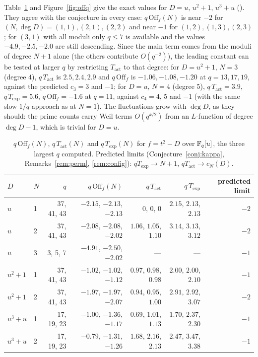 \documentclass[11pt,a4paper]{article}
\theoremstyle{remark}\newtheorem{remark}[theorem]{Remark}
\newcommand{\Off}{\mathrm{Off}}\newcommand{\e}{\mathrm{e}}
\begin{document}
Table~\ref{tab:offq} and Figure~\ref{fig:offq} give the exact values for $D=u$, $u^2+1$, $u^3+u$
().
They agree with the conjecture in every case: $q\,\Off_f(N)$ is near $-2$ for $(N,\deg D)=(1,1),(2,1),(2,2)$ and
near $-1$ for $(1,2),(1,3),(2,3)$; for $(3,1)$ with all moduli only $q\le7$ is available and the values $-4.9,-2.5,-2.0$
are still descending. Since the main term comes from the moduli of degree $N+1$ alone (the others contribute
$O(q^{-2})$), the leading constant can be tested at larger $q$ by restricting $T_{\mathrm{act}}$ to that degree: for
$D=u^2+1$, $N=3$ (degree $4$), $q\,T_{\mathrm{act}}$ is $2.5,2.4,2.9$ and $q\,\Off_f$ is $-1.06,-1.08,-1.20$ at $q=13,17,19$,
against the predicted $c_3=3$ and $-1$; for $D=u$, $N=4$ (degree $5$), $q\,T_{\mathrm{act}}=3.9$, $q\,T_{\exp}=5.6$,
$q\,\Off_f=-1.6$ at $q=11$, against $c_4=4$, $5$ and $-1$ (with the same slow $1/q$ approach as at $N=1$). The fluctuations grow with $\deg D$, as they should:
the prime counts carry Weil terms $O(q^{k/2})$ from an $L$-function of degree $\deg D-1$, which is trivial for
$D=u$.

\begin{table}[htbp]\centering\small
\caption{$q\,\Off_f(N)$, $q\,T_{\mathrm{act}}(N)$ and $q\,T_{\exp}(N)$ for $f=t^2-D$ over $\mathbb{F}_q[u]$, the three largest $q$ computed.
Predicted limits (Conjecture~\ref{conj:kappa}, Remarks~\ref{rem:perm}, \ref{rem:config}): $qT_{\exp}\to N+1$, $qT_{\mathrm{act}}\to c_N(D)$.}
\label{tab:offq}
\footnotesize\setlength{\tabcolsep}{3.5pt}
\begin{tabular}{llrrrrr}\toprule
$D$ & $N$ & $q$ & $q\,\Off_f(N)$ & $q\,T_{\mathrm{act}}$ & $q\,T_{\exp}$ & predicted limit\\\midrule
$u$     & 1 & 37, 41, 43 & $-2.15$, $-2.13$, $-2.13$ & $0$, $0$, $0$ & $2.15$, $2.13$, $2.13$ & $-2$\\
$u$     & 2 & 37, 41, 43 & $-2.08$, $-2.08$, $-2.02$ & $1.06$, $1.05$, $1.10$ & $3.14$, $3.13$, $3.12$ & $-2$\\
$u$     & 3 & 3, 5, 7    & $-4.91$, $-2.50$, $-2.02$ & --- & --- & $-1$\\
$u^2+1$ & 1 & 37, 41, 43 & $-1.02$, $-1.02$, $-1.12$ & $0.97$, $0.98$, $0.98$ & $2.00$, $2.00$, $2.10$ & $-1$\\
$u^2+1$ & 2 & 37, 41, 43 & $-1.97$, $-1.97$, $-2.07$ & $0.94$, $0.95$, $1.00$ & $2.91$, $2.92$, $3.07$ & $-2$\\
$u^3+u$ & 1 & 17, 19, 23 & $-1.00$, $-1.36$, $-1.17$ & $0.69$, $1.01$, $1.13$ & $1.70$, $2.37$, $2.30$ & $-1$\\
$u^3+u$ & 2 & 17, 19, 23 & $-0.79$, $-1.31$, $-1.26$ & $1.68$, $2.16$, $2.13$ & $2.47$, $3.47$, $3.38$ & $-1$\\\bottomrule
\end{tabular}
\end{table}
\end{document}
